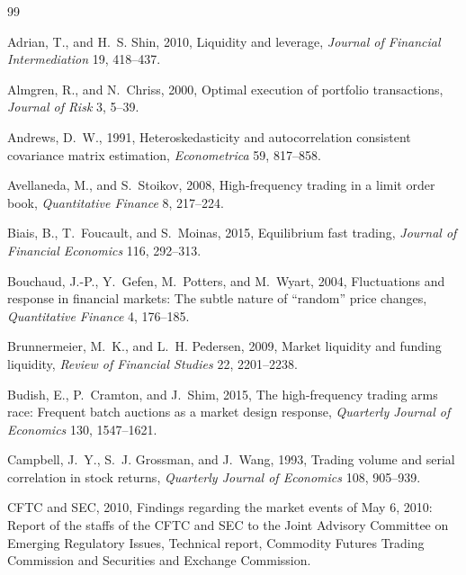 \documentclass[12pt]{article}
\theoremstyle{definition}
\theoremstyle{remark}
\begin{document}
\newpage
\begin{thebibliography}{99}
\small
\setlength{\itemsep}{0.0pt plus 0.3pt}
\setlength{\parsep}{0.0pt}

Adrian, T., and H.~S. Shin, 2010, Liquidity and leverage, \emph{Journal of Financial Intermediation} 19, 418--437.

Almgren, R., and N.~Chriss, 2000, Optimal execution of portfolio transactions, \emph{Journal of Risk} 3, 5--39.

Andrews, D.~W., 1991, Heteroskedasticity and autocorrelation consistent covariance matrix estimation, \emph{Econometrica} 59, 817--858.

Avellaneda, M., and S.~Stoikov, 2008, High-frequency trading in a limit order book, \emph{Quantitative Finance} 8, 217--224.

Biais, B., T.~Foucault, and S.~Moinas, 2015, Equilibrium fast trading, \emph{Journal of Financial Economics} 116, 292--313.

Bouchaud, J.-P., Y.~Gefen, M.~Potters, and M.~Wyart, 2004, Fluctuations and response in financial markets: The subtle nature of ``random'' price changes, \emph{Quantitative Finance} 4, 176--185.

Brunnermeier, M.~K., and L.~H. Pedersen, 2009, Market liquidity and funding liquidity, \emph{Review of Financial Studies} 22, 2201--2238.

Budish, E., P.~Cramton, and J.~Shim, 2015, The high-frequency trading arms race: Frequent batch auctions as a market design response, \emph{Quarterly Journal of Economics} 130, 1547--1621.

Campbell, J.~Y., S.~J. Grossman, and J.~Wang, 1993, Trading volume and serial correlation in stock returns, \emph{Quarterly Journal of Economics} 108, 905--939.

CFTC and SEC, 2010, Findings regarding the market events of May 6, 2010: Report of the staffs of the CFTC and SEC to the Joint Advisory Committee on Emerging Regulatory Issues, Technical report, Commodity Futures Trading Commission and Securities and Exchange Commission.


\end{thebibliography}
\end{document}

